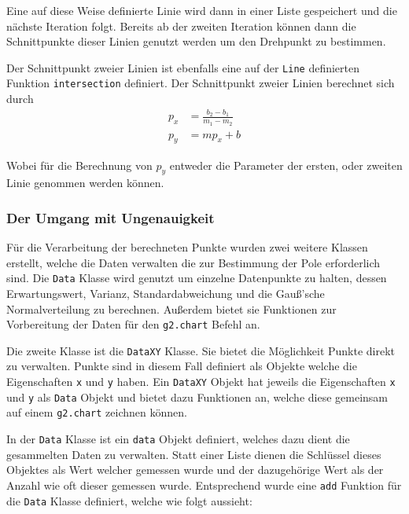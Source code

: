 Eine auf diese Weise definierte Linie wird dann in einer Liste gespeichert und die nächste Iteration folgt.
Bereits ab der zweiten Iteration können dann die Schnittpunkte dieser Linien genutzt werden um den Drehpunkt zu bestimmen.

Der Schnittpunkt zweier Linien ist ebenfalls eine auf der \lstinline{Line} definierten Funktion \lstinline{intersection} definiert.
Der Schnittpunkt zweier Linien berechnet sich durch
\begin{equation}
    \begin{split}
        p_x &= \frac{b_2 - b_1}{m_1 - m_2} \\
        p_y &= m p_x + b
    \end{split}
    \label{eq:schnittpunkt}
\end{equation}

Wobei für die Berechnung von $p_y$ entweder die Parameter der ersten, oder zweiten Linie genommen werden können.

\subsubsection{Der Umgang mit Ungenauigkeit}

Für die Verarbeitung der berechneten Punkte wurden zwei weitere Klassen erstellt, welche die Daten verwalten die zur Bestimmung der Pole erforderlich sind.
Die \lstinline{Data} Klasse wird genutzt um einzelne Datenpunkte zu halten, dessen Erwartungswert, Varianz, Standardabweichung und die Gauß'sche Normalverteilung zu berechnen.
Außerdem bietet sie Funktionen zur Vorbereitung der Daten für den \lstinline{g2.chart} Befehl an.

Die zweite Klasse ist die \lstinline{DataXY} Klasse.
Sie bietet die Möglichkeit Punkte direkt zu verwalten.
Punkte sind in diesem Fall definiert als Objekte welche die Eigenschaften \lstinline{x} und \lstinline{y} haben.
Ein \lstinline{DataXY} Objekt hat jeweils die Eigenschaften \lstinline{x} und \lstinline{y} als \lstinline{Data} Objekt und bietet dazu Funktionen an, welche diese gemeinsam auf einem \lstinline{g2.chart} zeichnen können.

In der \lstinline{Data} Klasse ist ein \lstinline{data} Objekt definiert, welches dazu dient die gesammelten Daten zu verwalten.
Statt einer Liste dienen die Schlüssel dieses Objektes als Wert welcher gemessen wurde und der dazugehörige Wert als der Anzahl wie oft dieser gemessen wurde.
Entsprechend wurde eine \lstinline{add} Funktion für die \lstinline{Data} Klasse definiert, welche wie folgt aussieht:

